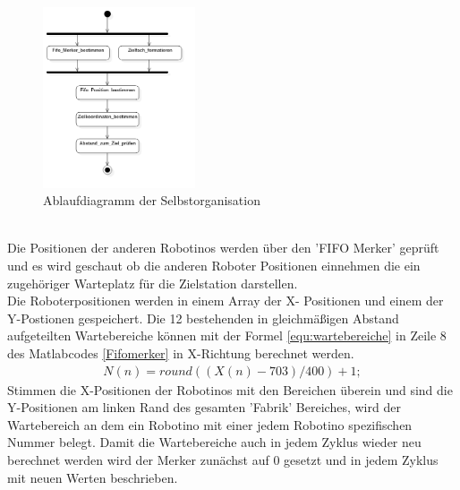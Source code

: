 \begin{figure}[H]
	\centering
	\includegraphics[width=0.4\textwidth]{Bilder/FIFO_Steuerung.png}
	\caption{Ablaufdiagramm der Selbstorganisation}
	\label{AblaufdiagrammFIFO}
\end{figure}
\noindent
\\
Die Positionen der anderen Robotinos werden über den 'FIFO Merker' geprüft und es wird geschaut ob die anderen Roboter Positionen einnehmen die ein zugehöriger Warteplatz für die Zielstation darstellen.\\
Die Roboterpositionen werden in einem Array der X- Positionen und einem der Y-Postionen gespeichert. Die 12 bestehenden in gleichmäßigen Abstand aufgeteilten Wartebereiche können mit der Formel \ref{equ:wartebereiche} in Zeile 8 des Matlabcodes \ref{Fifomerker} in X-Richtung berechnet werden.\\
\begin{align}
\label{equ:wartebereiche}
  N(n)=round((X(n)-703)/400)+1;
  \end{align}  
Stimmen die X-Positionen der Robotinos mit den Bereichen überein und sind die Y-Positionen am linken Rand des gesamten 'Fabrik' Bereiches, wird der Wartebereich an dem ein Robotino mit einer jedem Robotino spezifischen Nummer belegt.
Damit die Wartebereiche auch in jedem Zyklus wieder neu berechnet werden wird der Merker zunächst auf 0 gesetzt und in jedem Zyklus mit neuen Werten beschrieben.\\

